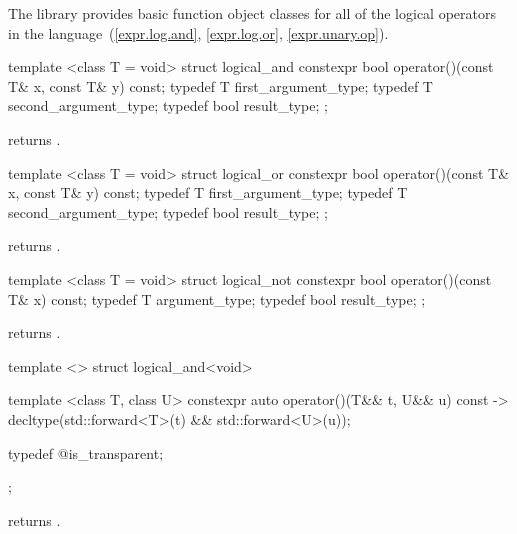 \pnum
The library provides basic function object classes for all of the logical
operators in the language~(\ref{expr.log.and}, \ref{expr.log.or}, \ref{expr.unary.op}).

%
\begin{itemdecl}
template <class T = void> struct logical_and {
  constexpr bool operator()(const T& x, const T& y) const;
  typedef T first_argument_type;
  typedef T second_argument_type;
  typedef bool result_type;
};
\end{itemdecl}

\begin{itemdescr}
\pnum
{} returns .
\end{itemdescr}

%
\begin{itemdecl}
template <class T = void> struct logical_or {
  constexpr bool operator()(const T& x, const T& y) const;
  typedef T first_argument_type;
  typedef T second_argument_type;
  typedef bool result_type;
};
\end{itemdecl}

\begin{itemdescr}
\pnum
{} returns .
\end{itemdescr}

%
\begin{itemdecl}
template <class T = void> struct logical_not {
  constexpr bool operator()(const T& x) const;
  typedef T argument_type;
  typedef bool result_type;
};
\end{itemdecl}

\begin{itemdescr}
\pnum
{} returns .
\end{itemdescr}

%
\begin{itemdecl}
template <> struct logical_and<void> {
  template <class T, class U> constexpr auto operator()(T&& t, U&& u) const
    -> decltype(std::forward<T>(t) && std::forward<U>(u));

  typedef @\unspec@ is_transparent;
};
\end{itemdecl}

\begin{itemdescr}
\pnum
{} returns .
\end{itemdescr}

